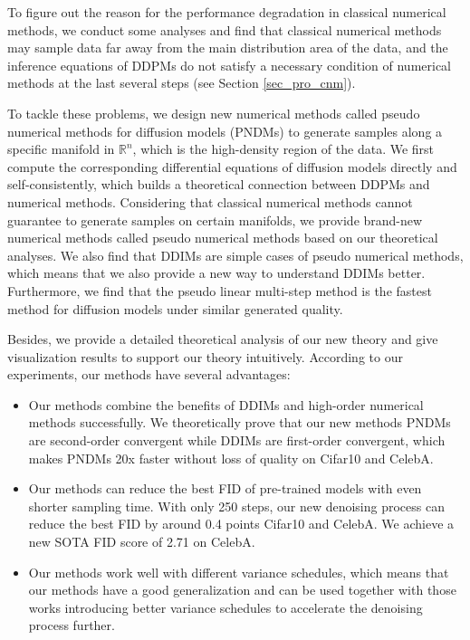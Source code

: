 \documentclass{article}
\begin{document}
To figure out the reason for the performance degradation in classical numerical methods, we conduct some analyses and find that classical numerical methods may sample data far away from the main distribution area of the data, and the inference equations of DDPMs do not satisfy a necessary condition of numerical methods at the last several steps (see Section \ref{sec_pro_cnm}).

To tackle these problems, we design new numerical methods called pseudo numerical methods for diffusion models (PNDMs) to generate samples along a specific manifold in $\mathbb{R}^n$, which is the high-density region of the data. We first compute the corresponding differential equations of diffusion models directly and self-consistently, which builds a theoretical connection between DDPMs and numerical methods. Considering that classical numerical methods cannot guarantee to generate samples on certain manifolds, we provide brand-new numerical methods called pseudo numerical methods based on our theoretical analyses. We also find that DDIMs are simple cases of pseudo numerical methods, which means that we also provide a new way to understand DDIMs better. Furthermore, we find that the pseudo linear multi-step method is the fastest method for diffusion models under similar generated quality.

Besides, we provide a detailed theoretical analysis of our new theory and give visualization results to support our theory intuitively. According to our experiments, our methods have several advantages:

\begin{itemize}[leftmargin=*]
   \item Our methods combine the benefits of DDIMs and high-order numerical methods successfully. We theoretically prove that our new methods PNDMs are second-order convergent while DDIMs are first-order convergent, which makes PNDMs 20x faster without loss of quality on Cifar10 and CelebA.
   \item Our methods can reduce the best FID of pre-trained models with even shorter sampling time. With only 250 steps, our new denoising process can reduce the best FID by around 0.4 points Cifar10 and CelebA. We achieve a new SOTA FID score of 2.71 on CelebA.
   \item Our methods work well with different variance schedules, which means that our methods have a good generalization and can be used together with those works introducing better variance schedules to accelerate the denoising process further.
\end{itemize}
\end{document}
